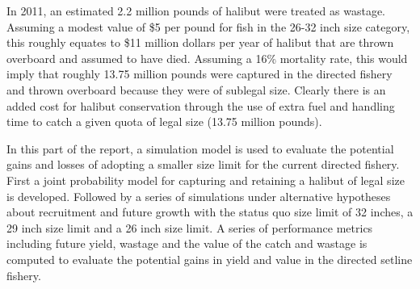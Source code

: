  In 2011, an estimated 2.2 million pounds of halibut were treated as wastage.  Assuming a modest value of \$5 per pound for fish in the 26-32 inch size category, this roughly equates to \$11 million dollars per year of halibut that are thrown overboard and assumed to have died.  Assuming a 16\% mortality rate, this would imply that roughly 13.75 million pounds were captured in the directed fishery and thrown overboard because they were of sublegal size.  Clearly there is an added cost for halibut conservation through the use of extra fuel and handling time to catch a given quota of legal size (13.75 million pounds).

In this part of the report, a simulation model is used to evaluate the potential gains and losses of adopting a smaller size limit for the current directed fishery.  First a joint probability model for capturing and retaining a halibut of legal size is developed.  Followed by a series of simulations under alternative hypotheses about recruitment and future growth with the status quo size limit of 32 inches, a 29 inch size limit and a 26 inch size limit.  A series of performance metrics including future yield, wastage and the value of the catch and wastage is computed to evaluate the potential gains in yield and value in the directed setline fishery.

